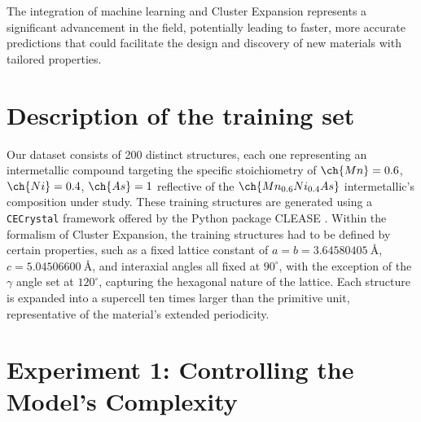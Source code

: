 \documentclass{article}
\let\citep\parencite   %
\begin{document}
The integration of machine learning and Cluster Expansion represents a significant advancement in the field, potentially leading to faster, more accurate predictions that could facilitate the design and discovery of new materials with tailored properties.\\
\section{Description of the training set}
Our dataset consists of 200 distinct structures, each one  representing an intermetallic compound targeting the specific stoichiometry of $\ch{Mn}=0.6 $, $\ch{Ni}=0.4$, $\ch{As}=1$ reflective of the $\ch{Mn_{0.6}Ni_{0.4}As}$ intermetallic's composition under study. These training structures are generated using a \texttt{CECrystal} framework offered by the Python package CLEASE \citep{CLEASE}. Within the formalism of Cluster Expansion, the training structures had to be defined by certain properties, such as a fixed lattice constant of \(a = b = 3.64580405\ Å\), \(c = 5.04506600\ Å\), and interaxial angles all fixed at \(90^\circ\), with the exception of the \(\gamma\) angle set at \(120^\circ\), capturing the hexagonal nature of the lattice. Each structure is expanded into a supercell ten times larger than the primitive unit, representative of the material's extended periodicity. 
\begin{comment}
  In order to ensure an accurate model, since the training set provides the foundation upon which the machine learning model will learn to predict the energy and thermodynamic properties of the \ch{MnNiAs} system, it is important to ensure the comprehensive range of atomic configurations. In materials science, we say that the training set needs to span the entire configuration space.   
\end{comment}
\section{Experiment 1: Controlling the Model's Complexity}
\label{sec:Experiment1}
\end{document}
